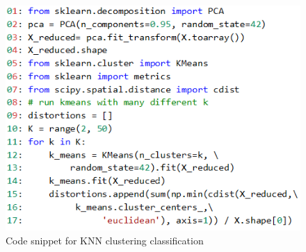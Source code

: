 \begin{figure}[H]
   \centering
   \includegraphics[width=\linewidth]{fig/CodeSnippetSentimentProcess.png}
    \caption{Code snippet for KNN clustering classification}
    \label{fig:CodeSnippetSentimentProcess}
\end{figure}


